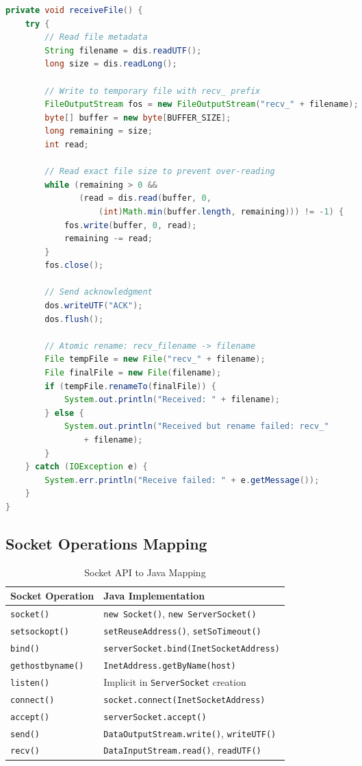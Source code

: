 \documentclass[12pt, letterpaper]{article}
\begin{document}
\begin{lstlisting}[language=Java,caption=Client/Server File Receiving,label=code:receivefile]
private void receiveFile() {
    try {
        // Read file metadata
        String filename = dis.readUTF();
        long size = dis.readLong();
        
        // Write to temporary file with recv_ prefix
        FileOutputStream fos = new FileOutputStream("recv_" + filename);
        byte[] buffer = new byte[BUFFER_SIZE];
        long remaining = size;
        int read;
        
        // Read exact file size to prevent over-reading
        while (remaining > 0 && 
               (read = dis.read(buffer, 0, 
                   (int)Math.min(buffer.length, remaining))) != -1) {
            fos.write(buffer, 0, read);
            remaining -= read;
        }
        fos.close();
        
        // Send acknowledgment
        dos.writeUTF("ACK");
        dos.flush();
        
        // Atomic rename: recv_filename -> filename
        File tempFile = new File("recv_" + filename);
        File finalFile = new File(filename);
        if (tempFile.renameTo(finalFile)) {
            System.out.println("Received: " + filename);
        } else {
            System.out.println("Received but rename failed: recv_" 
                + filename);
        }
    } catch (IOException e) {
        System.err.println("Receive failed: " + e.getMessage());
    }
}
\end{lstlisting}

\subsection{Socket Operations Mapping}

\begin{table}[h]
\centering
\begin{tabular}{|l|l|}
\hline
\textbf{Socket Operation} & \textbf{Java Implementation} \\ \hline
\texttt{socket()} & \texttt{new Socket()}, \texttt{new ServerSocket()} \\ \hline
\texttt{setsockopt()} & \texttt{setReuseAddress()}, \texttt{setSoTimeout()} \\ \hline
\texttt{bind()} & \texttt{serverSocket.bind(InetSocketAddress)} \\ \hline
\texttt{gethostbyname()} & \texttt{InetAddress.getByName(host)} \\ \hline
\texttt{listen()} & Implicit in \texttt{ServerSocket} creation \\ \hline
\texttt{connect()} & \texttt{socket.connect(InetSocketAddress)} \\ \hline
\texttt{accept()} & \texttt{serverSocket.accept()} \\ \hline
\texttt{send()} & \texttt{DataOutputStream.write()}, \texttt{writeUTF()} \\ \hline
\texttt{recv()} & \texttt{DataInputStream.read()}, \texttt{readUTF()} \\ \hline
\end{tabular}
\caption{Socket API to Java Mapping}
\end{table}
\end{document}
